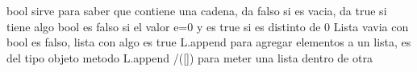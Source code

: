 bool sirve para saber que contiene una cadena, da falso si es vacia, da true si tiene algo
bool es falso si el valor e=0 y es true si es distinto de 0
Lista vavia con bool es falso, lista con algo es true
L.append para agregar elementos a un lista, es del tipo objeto metodo
L.append /([]) para meter una lista dentro de otra